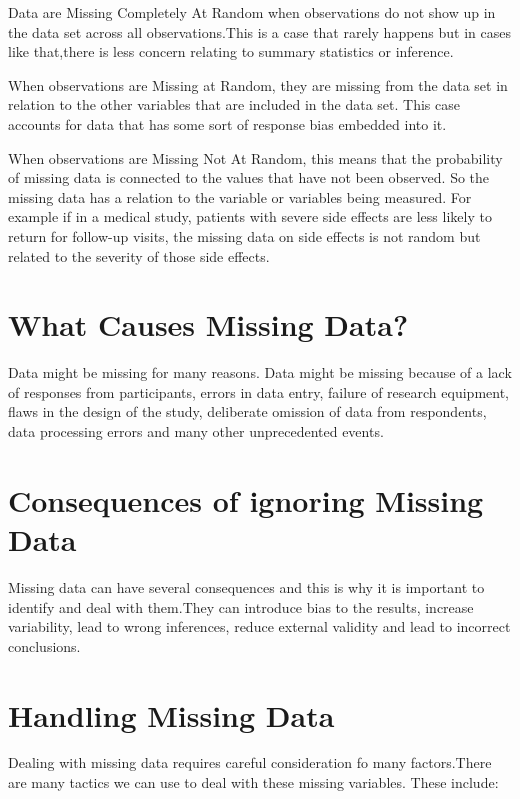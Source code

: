 \documentclass[
  letterpaper,
  DIV=11,
  numbers=noendperiod]{scrartcl}
\begin{document}
Data are Missing Completely At Random when observations do not show up
in the data set across all observations.This is a case that rarely
happens but in cases like that,there is less concern relating to summary
statistics or inference.

When observations are Missing at Random, they are missing from the data
set in relation to the other variables that are included in the data
set. This case accounts for data that has some sort of response bias
embedded into it.

When observations are Missing Not At Random, this means that the
probability of missing data is connected to the values that have not
been observed. So the missing data has a relation to the variable or
variables being measured. For example if in a medical study, patients
with severe side effects are less likely to return for follow-up visits,
the missing data on side effects is not random but related to the
severity of those side effects.

\section{What Causes Missing Data?}\label{what-causes-missing-data}

Data might be missing for many reasons. Data might be missing because of
a lack of responses from participants, errors in data entry, failure of
research equipment, flaws in the design of the study, deliberate
omission of data from respondents, data processing errors and many other
unprecedented events.

\section{Consequences of ignoring Missing
Data}\label{consequences-of-ignoring-missing-data}

Missing data can have several consequences and this is why it is
important to identify and deal with them.They can introduce bias to the
results, increase variability, lead to wrong inferences, reduce external
validity and lead to incorrect conclusions.

\section{Handling Missing Data}\label{handling-missing-data}

Dealing with missing data requires careful consideration fo many
factors.There are many tactics we can use to deal with these missing
variables. These include:
\end{document}
